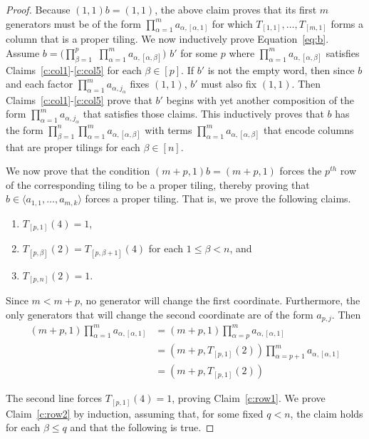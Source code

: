 \documentclass{amsart}
\theoremstyle{remark}
\numberwithin{equation}{section}
\begin{document}
\begin{proof}
Because $(1,1)b = (1,1)$, the above claim proves that its first $m$ generators must be of the form $\prod_{\alpha=1}^m a_{\alpha,[\alpha,1]}$ for which $T_{[1,1]},\dots,T_{[m,1]}$ forms a column that is a proper tiling. We now inductively prove Equation~\ref{eq:b}. Assume $b=(\prod_{\beta=1}^p$ $\prod_{\alpha=1}^m a_{\alpha,[\alpha,\beta]})$ $b'$ for some $p$ where $\prod_{\alpha=1}^m a_{\alpha,[\alpha,\beta]}$ satisfies Claims~\ref{c:col1}-\ref{c:col5} for each $\beta \in [p]$. If $b'$ is not the empty word, then since $b$ and each factor $\prod_{\alpha=1}^m a_{\alpha,j_\alpha}$ fixes $(1,1)$, $b'$ must also fix $(1,1)$. Then Claims~\ref{c:col1}-\ref{c:col5} prove that $b'$ begins with yet another composition of the form $\prod_{\alpha=1}^m a_{\alpha,j_\alpha}$ that satisfies those claims. This inductively proves that $b$ has the form $\prod_{\beta = 1}^n \prod_{\alpha=1}^m a_{\alpha,[\alpha,\beta]}$ with terms $\prod_{\alpha=1}^m a_{\alpha,[\alpha,\beta]}$ that encode columns that are proper tilings for each $\beta \in [n]$.

We now prove that the condition $(m+p,1)b=(m+p,1)$ forces the $p^{th}$ row of the corresponding tiling to be a proper tiling, thereby proving that $b \in \langle a_{1,1},\dots,a_{m,k}\rangle$ forces a proper tiling. That is, we prove the following claims.
\begin{enumerate}
\item $T_{[p,1]}(4) = 1$, \label{c:row1}
\item $T_{[p,\beta]}(2) = T_{[p,\beta+1]}(4)$ for each $1 \leq \beta < n$, and \label{c:row2}
\item $T_{[p,n]}(2) = 1$. \label{c:row3}
\end{enumerate}

Since $m < m+p$, no generator will change the first coordinate. Furthermore, the only generators that will change the second coordinate are of the form $a_{p,j}$. Then 
\begin{align*}
(m+p,1)\prod_{\alpha=1}^m a_{\alpha,[\alpha,1]} &= (m+p,1) \prod_{\alpha=p}^m a_{\alpha,[\alpha,1]} \\
&= (m+p,T_{[p,1]}(2)) \prod_{\alpha=p+1}^m a_{\alpha,[\alpha,1]}\\
&= (m+p,T_{[p,1]}(2))
\end{align*}

The second line forces $T_{[p,1]}(4) = 1$, proving Claim~\ref{c:row1}. We prove Claim~\ref{c:row2} by induction, assuming that, for some fixed $q < n$, the claim holds for each $\beta \leq q$ and that the following is true.


\end{proof}
\end{document}
